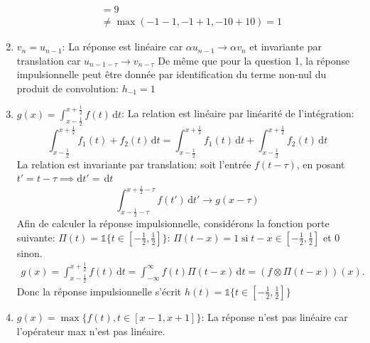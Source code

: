 \documentclass[12pt]{article}
\begin{document}
\begin{enumerate}
\begin{equation*}
\begin{split}
			&= 9 \\
			&\neq \max(-1-1, -1+1, -10 + 10) = 1
\end{split}
\end{equation*}
\item $v_n = u_{n-1}$: \newline
La réponse est linéaire car $\alpha u_{n-1} \rightarrow \alpha v_n$ et invariante par translation \newline car $u_{n-1-\tau} \rightarrow v_{n-\tau}$ \newline
De même que pour la question 1, la réponse impulsionnelle peut être donnée par identification du terme non-nul du produit de convolution: $h_{-1} = 1$
\item $g(x) = \int_{x-\frac{1}{2}}^{x+\frac{1}{2}} f(t) \,\mathrm{d}t$: \newline
La relation est linéaire par linéarité de l'intégration: $$\int_{x-\frac{1}{2}}^{x+\frac{1}{2}} f_1(t) + f_2(t) \,\mathrm{d}t = \int_{x-\frac{1}{2}}^{x+\frac{1}{2}} f_1(t) \,\mathrm{d}t+ \int_{x-\frac{1}{2}}^{x+\frac{1}{2}} f_2(t) \,\mathrm{d}t$$ \newline
La relation est invariante par translation: soit l'entrée $f(t-\tau)$, \newline en posant $t' = t -\tau \implies \mathrm{d}t' = \,\mathrm{d}t $ $$\int_{x-\frac{1}{2}-\tau}^{x+\frac{1}{2}-\tau} f(t')\,\mathrm{d}t' \rightarrow g(x-\tau)$$
Afin de calculer la réponse impulsionnelle, considérons la fonction porte suivante: $\Pi(t) = \mathds{1}\{t \in {[{-\frac{1}{2}}, \frac{1}{2}]}\}$:  $\Pi(t-x) = 1 \;\text{si}\; t-x \in {[{-\frac{1}{2}}, \frac{1}{2}]}$ et 0 sinon.\newline
\begin{equation*}\begin{split}
g(x) = \int_{x-\frac{1}{2}}^{x+\frac{1}{2}} f(t) \,\mathrm{d}t = \int_{-\infty}^{\infty} f(t) \Pi(t-x) \,\mathrm{d}t = (f \otimes \Pi(t-x))(x).
\end{split}\end{equation*}
Donc la réponse impulsionnelle s'écrit $h(t) = \mathds{1}\{t\in {[{-\frac{1}{2}}, \frac{1}{2}]}\}$
\item $g(x) = \max\{f(t), t \in {[x-1, x+1]}\}$: \newline
La réponse n'est pas linéaire car l'opérateur max n'est pas linéaire.
\end{enumerate}
\end{document}
